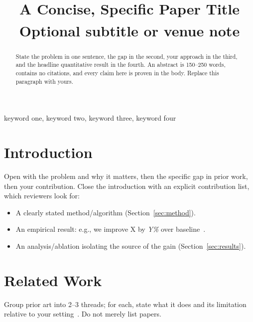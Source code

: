 \documentclass[conference]{IEEEtran}
\begin{document}
\title{A Concise, Specific Paper Title\\
{\footnotesize \textsuperscript{}Optional subtitle or venue note}}

\author{
\and
{}
}

\maketitle

\begin{abstract}
State the problem in one sentence, the gap in the second, your approach in the
third, and the headline quantitative result in the fourth. An abstract is
150--250 words, contains no citations, and every claim here is proven in the body.
Replace this paragraph with yours.
\end{abstract}

\begin{IEEEkeywords}
keyword one, keyword two, keyword three, keyword four
\end{IEEEkeywords}

\section{Introduction}
Open with the problem and why it matters, then the specific gap in prior work,
then your contribution. Close the introduction with an explicit contribution
list, which reviewers look for:
\begin{itemize}
\item A clearly stated method/algorithm (Section~\ref{sec:method}).
\item An empirical result: e.g., we improve X by \emph{Y\%} over baseline~\cite{ref_baseline}.
\item An analysis/ablation isolating the source of the gain (Section~\ref{sec:results}).
\end{itemize}

\section{Related Work}
Group prior art into 2--3 threads; for each, state what it does and its limitation
relative to your setting~\cite{ref_survey,ref_method}. Do not merely list papers.
\end{document}
